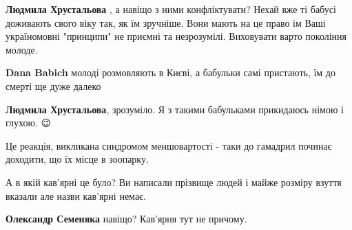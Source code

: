 \begin{itemize}
\begin{itemize}
\textbf{Людмила Хрустальова} , а навіщо з ними конфліктувати? Нехай вже ті бабусі доживають свого віку так, як їм зручніше. Вони мають на це право ім Ваші україномовні "принципи" не приємні та незрозумілі. Виховувати варто покоління молоде.

 
\textbf{Dana Babich} молоді розмовляють в Києві, а бабульки самі пристають, їм до смерті ще дуже далеко

 
\textbf{Людмила Хрустальова}, зрозуміло. Я з такими бабульками прикидаюсь німою і глухою. 😉
\end{itemize}

 
Це реакція, викликана синдромом меншовартості - таки до гамадрил починає доходити, що їх місце в зоопарку.

 
А в якій кав'ярні це було? Ви написали прізвище людей і майже розміру взуття вказали але назви кав'ярні немає.

\begin{itemize}
 
\textbf{Олександр Семеняка} навіщо? Кав'ярня тут не причому.

 

\end{itemize}
\end{itemize}
